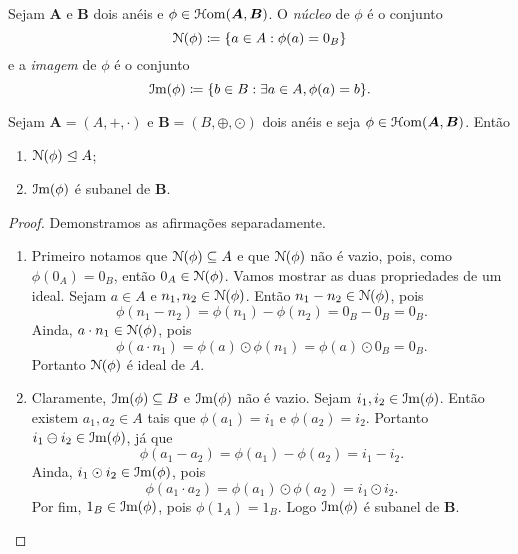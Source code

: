 \begin{defi}
	Sejam $\bm A$ e $\bm B$ dois anéis e $\phi \in \mathcal{H}\mathrm{om}(\bm A,\bm B)$. O \emph{núcleo} de $\phi$ é o conjunto
	\begin{equation*}
	\nuc(\phi) \coloneqq \{a \in A : \phi(a) = 0_B\}
	\end{equation*}
e a \emph{imagem} de $\phi$ é o conjunto
	\begin{equation*}
	\im(\phi) \coloneqq \{b \in B : \exists a \in A, \phi(a) = b\}.
	\end{equation*}
\end{defi}

\begin{prop}
	Sejam $\bm A=(A,+,\cdot)$ e $\bm B=(B,\oplus,\odot)$ dois anéis e seja $\phi \in \mathcal{H}\mathrm{om}(\bm A,\bm B)$. Então
	\begin{enumerate}
	\item $\mathcal{N}(\phi) \mathrel{\unlhd} A$;
	\item $\mathcal{I}\mathrm{m}(\phi)$ é subanel de $\textbf{B}$.
	\end{enumerate}
\end{prop}
\begin{proof}Demonstramos as afirmações separadamente.
	\begin{enumerate}
	\item Primeiro notamos que $\mathcal{N}(\phi) \subseteq A$ e que $\mathcal{N}(\phi)$ não é vazio, pois, como $\phi(0_A)=0_B$, então $0_A \in \mathcal{N}(\phi)$. Vamos mostrar as duas propriedades de um ideal. Sejam $a \in A$ e $n_1,n_2 \in \mathcal{N}(\phi)$. Então $n_1-n_2 \in \mathcal{N}(\phi)$, pois
	\begin{equation*}
	\phi(n_1-n_2) = \phi(n_1)-\phi(n_2) = 0_B - 0_B = 0_B.
	\end{equation*}
Ainda, $a \cdot n_1 \in \mathcal{N}(\phi)$, pois
	\begin{equation*}
	\phi(a \cdot n_1) = \phi(a) \odot \phi(n_1) = \phi(a) \odot 0_B = 0_B.
	\end{equation*}
Portanto $\mathcal{N}(\phi)$ é ideal de $A$.
	\item Claramente, $\mathcal{I}\mathrm{m}(\phi) \subseteq B$ e $\mathcal{I}\mathrm{m}(\phi)$ não é vazio. Sejam $i_1,i_2 \in \mathcal{I}\mathrm{m}(\phi)$. Então existem $a_1,a_2 \in A$ tais que $\phi(a_1)=i_1$ e $\phi(a_2)=i_2$. Portanto $i_1 \ominus i_2 \in \mathcal{I}\mathrm{m}(\phi)$, já que
	\begin{equation*}
	\phi(a_1-a_2)= \phi(a_1)-\phi(a_2)=i_1-i_2.
	\end{equation*}
Ainda, $i_1 \odot i_2 \in \mathcal{I}\mathrm{m}(\phi)$, pois
	\begin{equation*}
	\phi(a_1 \cdot a_2)= \phi(a_1) \odot \phi(a_2) = i_1 \odot i_2.
	\end{equation*}
Por fim, $1_B \in \mathcal{I}\mathrm{m}(\phi)$, pois $\phi(1_A)=1_B$. Logo $\mathcal{I}\mathrm{m}(\phi)$ é subanel de $\bm B$.
	\end{enumerate}
\end{proof}

